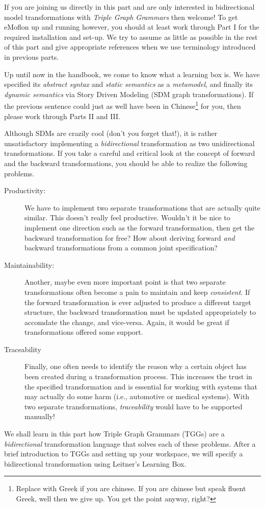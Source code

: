 \genHeader
\label{chap:Learning-Box-to-Dictionary-and-Back-Again}


If you are joining us directly in this part and are only interested in bidirectional model transformations with \emph{Triple Graph Grammars} then welcome! To
get eMoflon up and running however, you should at least work through Part I for the required installation and set-up. We try to assume as little as possible in
the rest of this part and give appropriate references when we use terminology introduced in previous parts.

Up until now in the handbook, we come to know what a learning box is. We have specified its \emph{abstract syntax} and \emph{static semantics} as a
\emph{metamodel}, and finally its \emph{dynamic semantics} via Story Driven Modeling (SDM graph transformations). If the previous sentence could just as well
have been in Chinese\footnote{Replace with Greek if you are chinese.  If you are chinese but speak fluent Greek, well then we give up. You get the point
anyway, right?} for you, then please work through Parts II and III.

Although SDMs are crazily cool (don't you forget that!), it is rather unsatisfactory implementing a \emph{bidirectional} transformation as two unidirectional
transformations. If you take a careful and critical look at the concept of forward and the backward transformations, you should be able to realize the following
problems.

\begin{description}
\item[Productivity:] We have to implement two separate transformations that are actually quite similar. This doesn't really feel productive.
Wouldn't it be nice to implement one direction such as the forward transformation, then get the backward transformation for free? How about deriving
forward \emph{and} backward transformations from a common joint specification?

\vspace{0.5cm}

\item[Maintainability:] Another, maybe even more important point is that two separate transformations often become a pain to maintain and keep
\emph{consistent}. If the forward transformation is ever adjusted to produce a different target structure, the backward transformation must be updated
appropriately to accomdate the change, and vice-versa.  Again, it would be great if transformations offered some support.

\item[Traceability] Finally, one often needs to identify the reason why a certain object has been created during a transformation process. This increases the
trust in the specified transformation and is essential for working with systems that may actually do some harm (i.e., automotive or medical     
systems). With two separate transformations, \emph{traceability} would have to be supported manually!
\end{description}

We shall learn in this part how Triple Graph Grammars (TGGs) are a \emph{bidirectional} transformation language that solves each of these problems. After a
brief introduction to TGGs and setting up your workspace, we will specify a bidirectional transformation using Leitner's Learning Box.
